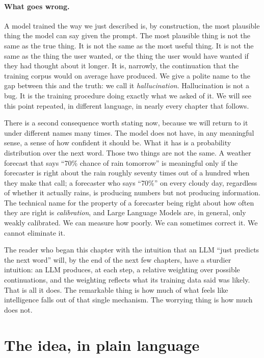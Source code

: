 \paragraph{What goes wrong.} A model trained the way we just described is, by construction,
the most plausible thing the model can say given the prompt. The
most plausible thing is not the same as the true thing. It is
not the same as the most useful thing. It is not the same as
the thing the user wanted, or the thing the user would have
wanted if they had thought about it longer. It is, narrowly, the
continuation that the training corpus would on average have
produced. We give a polite name to the gap between this and the
truth: we call it \emph{hallucination}. Hallucination is not a
bug. It is the training procedure doing exactly what we asked of
it. We will see this point repeated, in different language, in
nearly every chapter that follows.

There is a second consequence worth stating now, because we will
return to it under different names many times. The model does
not have, in any meaningful sense, a sense of how confident it
should be. What it has is a probability distribution over the
next word. Those two things are not the same. A weather forecast
that says ``70\% chance of rain tomorrow'' is meaningful only if
the forecaster is right about the rain roughly seventy times out
of a hundred when they make that call; a forecaster who says
``70\%'' on every cloudy day, regardless of whether it actually
rains, is producing numbers but not producing information. The
technical name for the property of a forecaster being right
about how often they are right is \emph{calibration}, and Large
Language Models are, in general, only weakly calibrated. We can
measure how poorly. We can sometimes correct it. We cannot
eliminate it.

The reader who began this chapter with the intuition that an LLM
``just predicts the next word'' will, by the end of the next few
chapters, have a sturdier intuition: an LLM produces, at each
step, a relative weighting over possible continuations, and the
weighting reflects what its training data said was likely. That
is all it does. The remarkable thing is how much of what feels
like intelligence falls out of that single mechanism. The
worrying thing is how much does not.

\section{The idea, in plain language}

